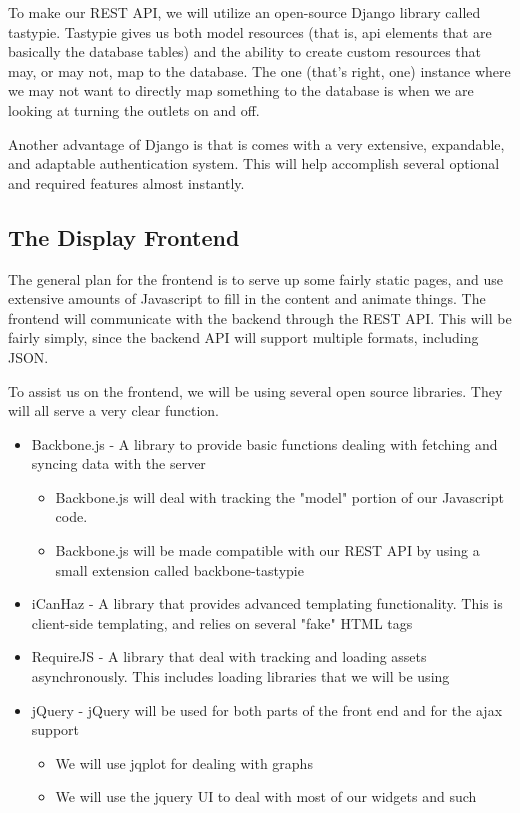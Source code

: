 To make our REST API, we will utilize an open-source Django library called tastypie.
Tastypie gives us both model resources (that is, api elements that are basically the database tables) and the ability to create custom resources that may, or may not, map to the database.
The one (that's right, one) instance where we may not want to directly map something to the database is when we are looking at turning the outlets on and off.

Another advantage of Django is that is comes with a very extensive, expandable, and adaptable authentication system.
This will help accomplish several optional and required features almost instantly.


\subsection{The Display Frontend}

The general plan for the frontend is to serve up some fairly static pages, and use extensive amounts of Javascript to fill in the content and animate things.
The frontend will communicate with the backend through the REST API.
This will be fairly simply, since the backend API will support multiple formats, including JSON.

To assist us on the frontend, we will be using several open source libraries.
They will all serve a very clear function.

\begin{itemize}
 \item Backbone.js - A library to provide basic functions dealing with fetching and syncing data with the server
 \begin{itemize}
  \item Backbone.js will deal with tracking the "model" portion of our Javascript code.
  \item Backbone.js will be made compatible with our REST API by using a small extension called backbone-tastypie
 \end{itemize}
 \item iCanHaz - A library that provides advanced templating functionality.
This is client-side templating, and relies on several "fake" HTML tags
 \item RequireJS - A library that deal with tracking and loading assets asynchronously.
This includes loading libraries that we will be using
 \item jQuery - jQuery will be used for both parts of the front end and for the ajax support
 \begin{itemize}
  \item We will use jqplot for dealing with graphs
  \item We will use the jquery UI to deal with most of our widgets and such
 \end{itemize}
\end{itemize}

